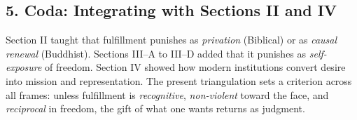 \subsection*{5. Coda: Integrating with Sections II and IV}
Section II taught that fulfillment punishes as \emph{privation} (Biblical) or as \emph{causal renewal} (Buddhist). Sections III--A to III--D added that it punishes as \emph{self-exposure} of freedom. Section IV showed how modern institutions convert desire into mission and representation. The present triangulation sets a criterion across all frames: unless fulfillment is \emph{recognitive}, \emph{non-violent} toward the face, and \emph{reciprocal} in freedom, the gift of what one wants returns as judgment.
